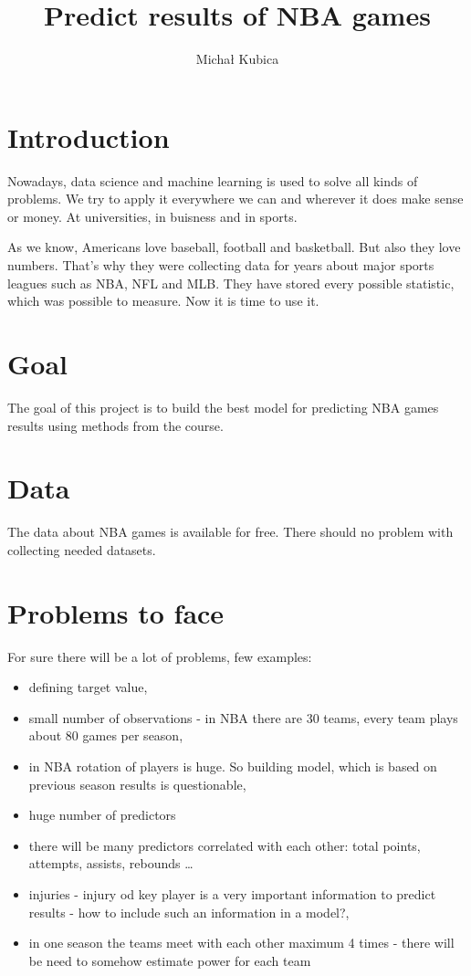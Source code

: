 \documentclass[10pt]{article}
\title{\textbf{Predict results of NBA games}}
\author{Michał Kubica}
\date{}
\begin{document}
\maketitle

\section{Introduction}

Nowadays, data science and machine learning is used to solve all kinds of problems. We try to apply it everywhere we can and wherever it does make sense or money. At universities, in buisness and in sports. 


As we know, Americans love baseball, football and basketball. But also they love numbers. That's why they were collecting data for years about major sports leagues such as NBA, NFL and MLB. They have stored every possible statistic, which was possible to measure. Now it is time to use it. 

\section{Goal}

The goal of this project is to build the best model for predicting NBA games results using methods from the course.

\section{Data}

The data about NBA games is available for free. There should no problem with collecting needed datasets.



\section{Problems to face}

For sure there will be a lot of problems, few examples:

\begin{itemize}
\item defining target value,
\item small number of observations - in NBA there are 30 teams, every team plays about 80 games per season,
\item in NBA rotation of players is huge. So building model, which is based on previous season results is questionable,
\item huge number of predictors
\item there will be many predictors correlated with each other: total points, attempts, assists, rebounds \dots
\item injuries - injury od key player is a very important information to predict results - how to include such an information in a model?, 
\item in one season the teams meet with each other maximum 4 times - there will be need to somehow estimate power for each team
\end{itemize}
\end{document}
